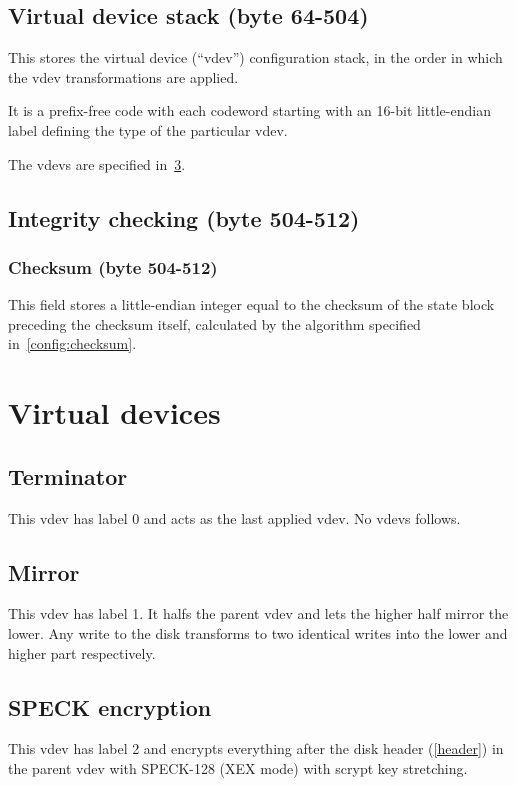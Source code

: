\documentclass[11pt,a4paper]{report}
\begin{document}
    \section{Virtual device stack (byte 64-504)}
        This stores the virtual device (``vdev'') configuration stack, in the
        order in which the vdev transformations are applied.

        It is a prefix-free code with each codeword starting with an 16-bit
        little-endian label defining the type of the particular vdev.

        The vdevs are specified in~\ref{vdev}.

    \section{Integrity checking (byte 504-512)}
        \subsection{Checksum (byte 504-512)}
        This field stores a little-endian integer equal to the checksum of the
        state block preceding the checksum itself, calculated by the algorithm
        specified in~\ref{config:checksum}.

    \chapter{Virtual devices}
    \label{vdev}
        \section{Terminator}
        This vdev has label 0 and acts as the last applied vdev. No vdevs
        follows.

        \section{Mirror}
        This vdev has label 1. It halfs the parent vdev and lets the higher
        half mirror the lower. Any write to the disk transforms to two
        identical writes into the lower and higher part respectively.

        \section{SPECK encryption}
        This vdev has label 2 and encrypts everything after the disk header
        (\ref{header}) in the parent vdev with SPECK-128 (XEX mode) with
        scrypt key stretching.
\end{document}

